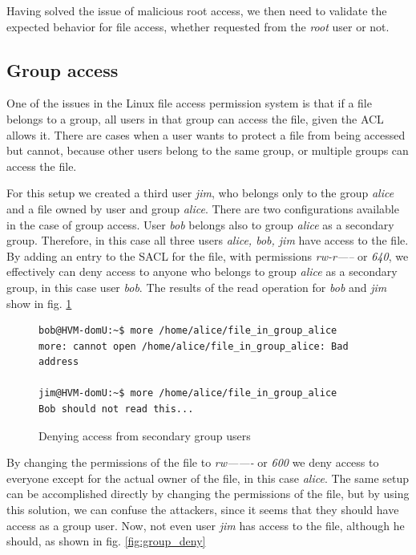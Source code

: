 \par Having solved the issue of malicious root access, we then need to validate the expected behavior for file access, whether requested from the \emph{root} user or not.

\subsection{Group access}

\par One of the issues in the Linux file access permission system is that if a file belongs to a group, all users in that group can access the file, given the \ac{ACL} allows it. There are cases when a user wants to protect a file from being accessed but cannot, because other users belong to the same group, or multiple groups can access the file. 

\par For this setup we created a third user \emph{jim}, who belongs only to the group \emph{alice} and a file owned by user and group \emph{alice}. There are two configurations available in the case of group access. User \emph{bob} belongs also to group \emph{alice} as a secondary group. Therefore, in this case all three users \emph{alice, bob, jim} have access to the file. By adding an entry to the \ac{SACL} for the file, with permissions \emph{rw-r-----} or \emph{640}, we effectively can deny access to anyone who belongs to group \emph{alice} as a secondary group, in this case user \emph{bob}. The results of the read operation for \emph{bob} and \emph{jim} show in fig. \ref{fig:sec_group_deny}

\begin{figure}[ht]
	\centering
	\scriptsize{\selectfont 
		\begin{lstlisting}
bob@HVM-domU:~$ more /home/alice/file_in_group_alice
more: cannot open /home/alice/file_in_group_alice: Bad address

jim@HVM-domU:~$ more /home/alice/file_in_group_alice
Bob should not read this...
		\end{lstlisting}}
	\caption{Denying access from secondary group users}
	\label{fig:sec_group_deny}
\end{figure}

\par By changing the permissions of the file to \emph{rw-------} or \emph{600} we deny access to everyone except for the actual owner of the file, in this case \emph{alice}. The same setup can be accomplished directly by changing the permissions of the file, but by using this solution, we can confuse the attackers, since it seems that they should have access as a group user. Now, not even user \emph{jim} has access to the file, although he should, as shown in fig. \ref{fig:group_deny}

